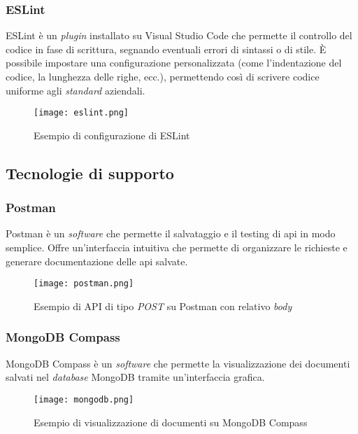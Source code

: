 \subsubsection{ESLint}
ESLint è un \textit{plugin} installato su Visual Studio Code che permette il controllo del codice in fase di scrittura, segnando eventuali errori di sintassi o di stile.
È possibile impostare una configurazione personalizzata (come l'indentazione del codice, la lunghezza delle righe, ecc.), permettendo così di scrivere codice uniforme agli \textit{standard} aziendali.
\begin{figure}[H]
    \centering
    \texttt{[image: eslint.png]}
    \caption{Esempio di configurazione di ESLint}
    \label{fig:ESlint}
\end{figure} 

\subsection{Tecnologie di supporto}
\subsubsection{Postman}
Postman è un \textit{software} che permette il salvataggio e il testing di \gls{api} in modo semplice. Offre un'interfaccia intuitiva che permette di organizzare le richieste e generare documentazione delle \gls{api} salvate.
\begin{figure}[H]
    \centering
    \texttt{[image: postman.png]}
    \caption{Esempio di API di tipo \textit{POST} su Postman con relativo \textit{body}}
    \label{fig:Postman}
\end{figure} 

\subsubsection{MongoDB Compass}
MongoDB Compass è un \textit{software} che permette la visualizzazione dei documenti salvati nel \textit{database} MongoDB tramite un'interfaccia grafica.
\begin{figure}[H]
    \centering
    \texttt{[image: mongodb.png]}
    \caption{Esempio di visualizzazione di documenti su MongoDB Compass}
    \label{fig:MongoDB}
\end{figure} 

